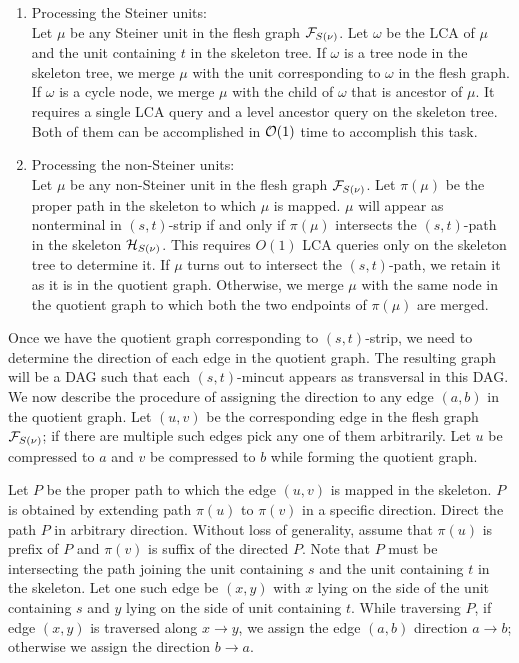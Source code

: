 \begin{enumerate}
    \item Processing the Steiner units:\\
    Let $\mu$ be any Steiner unit in the flesh graph ${\cal F}_{S(\nu)}$. Let $\omega$ be the LCA of $\mu$ and the unit containing $t$ in the skeleton tree. If $\omega$ is a tree node in the skeleton tree, we merge $\mu$ with the unit corresponding to $\omega$ in the flesh graph. If $\omega$ is a cycle node, we merge $\mu$ with the child of $\omega$ that is ancestor of $\mu$. It requires a single LCA query and a level ancestor query \cite{DBLP:journals/tcs/BenderF04} on the skeleton tree. Both of them can be accomplished in ${\cal O}(1)$ time to accomplish this task. 
    \item Processing the non-Steiner units:\\
    Let $\mu$ be any non-Steiner unit in the flesh graph ${\cal F}_{S(\nu)}$. Let $\pi(\mu)$ be the proper path in the skeleton to which $\mu$ is mapped. $\mu$ will appear as nonterminal in $(s,t)$-strip if and only if $\pi(\mu)$ intersects the $(s,t)$-path in the skeleton ${\cal H}_{S(\nu)}$. This requires $O(1)$ LCA queries only on the skeleton tree to determine it. If $\mu$ turns out to intersect the $(s,t)$-path, we retain it as it is in the quotient graph. Otherwise, we merge $\mu$ with
    the same node in the quotient graph to which both the two endpoints of $\pi(\mu)$ are merged.
\end{enumerate}

Once we have the quotient graph corresponding to $(s,t)$-strip, we need to determine the direction of each edge in the quotient graph. The resulting graph will be a DAG such that each $(s,t)$-mincut appears as transversal in this DAG. We now describe the procedure of assigning the direction to any edge $(a,b)$ in the quotient graph.
Let $(u,v)$ be the corresponding edge in the flesh graph ${\cal F}_{S(\nu)}$; if there are multiple such edges pick any one of them arbitrarily. 
Let $u$ be compressed to $a$ and $v$ be compressed to $b$ while forming the quotient graph. 

Let $P$ be the proper path to which the edge $(u,v)$ is mapped in the skeleton. $P$ is obtained by extending path $\pi(u)$ to $\pi(v)$ in a specific direction. Direct the path $P$ in arbitrary direction. Without loss of generality, assume that $\pi(u)$ is prefix of $P$ and $\pi(v)$ is suffix of the directed $P$. Note that $P$ must be intersecting the path joining the unit containing $s$ and the unit containing $t$ in the skeleton. Let one such edge be $(x,y)$
with $x$ lying on the side of the unit containing $s$ and $y$ lying on the side of unit containing $t$. While traversing $P$, if edge $(x,y)$ is traversed along $x\rightarrow y$, we assign the edge $(a,b)$ direction $a\rightarrow b$; otherwise we assign the direction $b \rightarrow a$.





